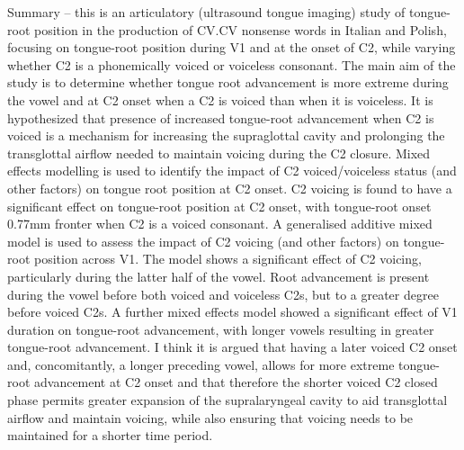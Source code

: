 \documentclass[]{article}
\begin{document}
Summary -- this is an articulatory (ultrasound tongue imaging) study of
tongue-root position in the production of CV.CV nonsense words in
Italian and Polish, focusing on tongue-root position during V1 and at
the onset of C2, while varying whether C2 is a phonemically voiced or
voiceless consonant. The main aim of the study is to determine whether
tongue root advancement is more extreme during the vowel and at C2 onset
when a C2 is voiced than when it is voiceless. It is hypothesized that
presence of increased tongue-root advancement when C2 is voiced is a
mechanism for increasing the supraglottal cavity and prolonging the
transglottal airflow needed to maintain voicing during the C2 closure.
Mixed effects modelling is used to identify the impact of C2
voiced/voiceless status (and other factors) on tongue root position at
C2 onset. C2 voicing is found to have a significant effect on
tongue-root position at C2 onset, with tongue-root onset 0.77mm fronter
when C2 is a voiced consonant. A generalised additive mixed model is
used to assess the impact of C2 voicing (and other factors) on
tongue-root position across V1. The model shows a significant effect of
C2 voicing, particularly during the latter half of the vowel. Root
advancement is present during the vowel before both voiced and voiceless
C2s, but to a greater degree before voiced C2s. A further mixed effects
model showed a significant effect of V1 duration on tongue-root
advancement, with longer vowels resulting in greater tongue-root
advancement. I think it is argued that having a later voiced C2 onset
and, concomitantly, a longer preceding vowel, allows for more extreme
tongue-root advancement at C2 onset and that therefore the shorter
voiced C2 closed phase permits greater expansion of the supralaryngeal
cavity to aid transglottal airflow and maintain voicing, while also
ensuring that voicing needs to be maintained for a shorter time period.
\end{document}
